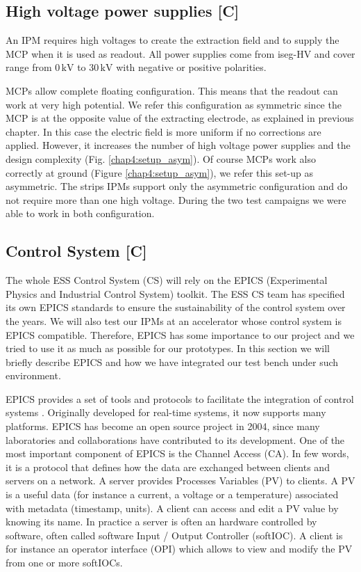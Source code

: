 \begin{refsection}
  \section{High voltage power supplies [C]}
  An IPM requires high voltages to create the extraction field and to supply the MCP when it is used as readout. All power supplies come from iseg-HV \cite{iseg2019} and cover range from $0\,\mathrm{kV}$ to $30\,\mathrm{kV}$ with negative or positive polarities.

  MCPs allow complete floating configuration. This means that the readout can work at very high potential. We refer this configuration as symmetric since the MCP is at the opposite value of the extracting electrode, as explained in previous chapter. In this case the electric field is more uniform if no corrections are applied. However, it increases the number of high voltage power supplies and the design complexity (Fig. \ref{chap4:setup_asym}).
  Of course MCPs work also correctly at ground (Figure \ref{chap4:setup_asym}), we refer this set-up as asymmetric. The strips IPMs support only the asymmetric configuration and do not require more than one high voltage. During the two test campaigns we were able to work in both configuration.

  

  \subsection{Control System [C]}
  The whole ESS Control System (CS) will rely on the EPICS (Experimental Physics and Industrial Control System) toolkit. The ESS CS team has specified its own EPICS standards to ensure the sustainability of the control system over the years. We will also test our IPMs at an accelerator whose control system is EPICS compatible. Therefore, EPICS has some importance to our project and we tried to use it as much as possible for our prototypes. In this section we will briefly describe EPICS and how we have integrated our test bench under such environment.

  EPICS provides a set of tools and protocols to facilitate the integration of control systems \cite{epics2019}. Originally developed for real-time systems, it now supports many platforms. EPICS has become an open source project in 2004, since many laboratories and collaborations have contributed to its development.
  One of the most important component of EPICS is the Channel Access (CA). In few words, it is a protocol that defines how the data are exchanged between clients and servers on a network. A server provides Processes Variables (PV) to clients. A PV is a useful data (for instance a current, a voltage or a temperature) associated with metadata (timestamp, units). A client can access and edit a PV value by knowing its name. In practice a server is often an hardware controlled by software, often called software Input / Output Controller (softIOC). A client is for instance an operator interface (OPI) which allows to view and modify the PV from one or more softIOCs.


\end{refsection}
